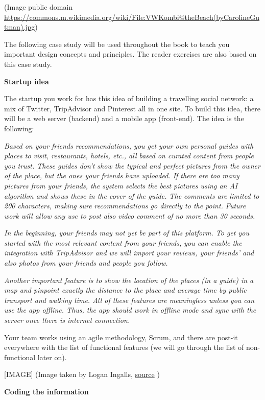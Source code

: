 \documentclass[]{article}
\begin{document}
(Image public domain
\url{https://commons.m.wikimedia.org/wiki/File:VWKombi@theBeach(byCarolineGutman).jpg})

The following case study will be used throughout the book to teach you
important design concepts and principles. The reader exercises are also
based on this case study.

\textbf{Startup idea}

The startup you work for has this idea of building a travelling social
network: a mix of Twitter, TripAdvisor and Pinterest all in one site. To
build this idea, there will be a web server (backend) and a mobile app
(front-end). The idea is the following:

\emph{Based on your friends recommendations, you get your own personal
guides with places to visit, restaurants, hotels, etc., all based on
curated content from people you trust. These guides don't show the
typical and perfect pictures from the owner of the place, but the ones
your friends have uploaded. If there are too many pictures from your
friends, the system selects the best pictures using an AI algorithm and
shows these in the cover of the guide. The comments are limited to 200
characters, making sure recommendations go directly to the point. Future
work will allow any use to post also video comment of no more than 30
seconds.}

\emph{In the beginning, your friends may not yet be part of this
platform. To get you started with the most relevant content from your
friends, you can enable the integration with TripAdvisor and we will
import your reviews, your friends' and also photos from your friends and
people you follow.}

\emph{Another important feature is to show the location of the places
(in a guide) in a map and pinpoint exactly the distance to the place and
average time by public transport and walking time. All of these features
are meaningless unless you can use the app offline. Thus, the app should
work in offline mode and sync with the server once there is internet
connection.}

Your team works using an agile methodology, Scrum, and there are post-it
everywhere with the list of functional features (we will go through the
list of non-functional later on).

{[}IMAGE{]} (Image taken by Logan Ingalls,
\href{https://commons.m.wikimedia.org/wiki/File:Scrum_task_board.jpg\#mw-jump-to-license}{source}
)

\textbf{Coding the information}
\end{document}
